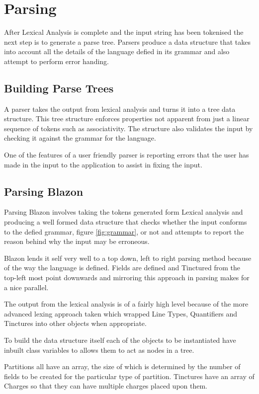 \chapter{Parsing}

After Lexical Analysis is complete and the input string has been tokenised the next step is to generate a parse tree.  Parsers produce a data structure that takes into account all the details of the language defied in its grammar and also attempt to perform error handing.

\section{Building Parse Trees}

A parser takes the output from lexical analysis and turns it into a tree data structure.  This tree structure enforces properties not apparent from just a linear sequence of tokens such as associativity.  The structure also validates the input by checking it against the grammar for the language.  

One of the features of a user friendly parser is reporting errors that the user has made in the input to the application to assist in fixing the input.


\section{Parsing Blazon}

Parsing Blazon involves taking the tokens generated form Lexical analysis and producing a well formed data structure that checks whether the input conforms to the defied grammar, figure \ref{fig:grammar}, or not and attempts to report the reason behind why the input may be erroneous.

Blazon lends it self very well to a top down, left to right parsing method because of the way the language is defined. Fields are defined and Tinctured from the top-left most point downwards and mirroring this approach in parsing makes for a nice parallel. 

The output from the lexical analysis is of a fairly high level because of the more advanced lexing approach taken which wrapped Line Types, Quantifiers and Tinctures into other objects when appropriate.  

To build the data structure itself each of the objects to be instantiated have inbuilt class variables to allows them to act as nodes in a tree. 

Partitions all have an array, the size of which is determined by the number of fields to be created for the particular type of partition.  Tinctures have an array of Charges so that they can have multiple charges placed upon them. 

